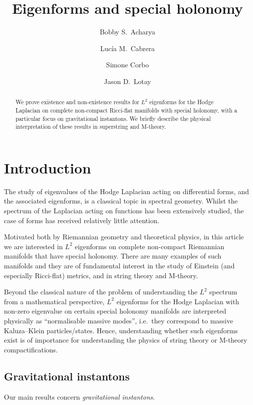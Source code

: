 \documentclass{article}
\title{Eigenforms and special holonomy}
\author{Bobby S.~Acharya \and Luc\'ia M.~Cabrera \and Simone Corbo \and Jason D.~Lotay}
\date{%
}
\theoremstyle{definition}
\numberwithin{thm}{section}
\numberwithin{equation}{section}
\begin{document}
\maketitle

\begin{abstract}
We prove existence and non-existence results for $L^2$ eigenforms for the Hodge Laplacian on complete non-compact Ricci-flat manifolds with special holonomy, with a particular focus on gravitational instantons. We briefly describe the physical interpretation of these results in superstring and M-theory.   
\end{abstract}

\tableofcontents

\section{Introduction}\label{sec:intro}

The study of eigenvalues of the Hodge Laplacian acting on differential forms, and the associated eigenforms, is a classical topic in spectral geometry.  Whilst the spectrum of the Laplacian acting on functions has been extensively studied, the case of forms has received relatively little attention.  

Motivated both by Riemannian geometry and theoretical physics, in this article we are interested in $L^2$ eigenforms on complete non-compact Riemannian manifolds that have special holonomy.  There are many examples of such manifolds and they are of fundamental interest in the study of Einstein (and especially Ricci-flat) metrics, and in string theory and M-theory.    

Beyond the classical nature of the problem of understanding the $L^2$ spectrum from a mathematical perspective, $L^2$ eigenforms for the Hodge Laplacian with non-zero eigenvalue on certain special holonomy manifolds are interpreted physically as ``normalisable massive modes'', i.e.~they correspond to massive Kaluza--Klein particles/states.  Hence, understanding whether such eigenforms exist is of importance for understanding the physics of string theory or M-theory compactifications. 


\subsection{Gravitational instantons}

Our main results concern \emph{gravitational instantons}.  
\end{document}
